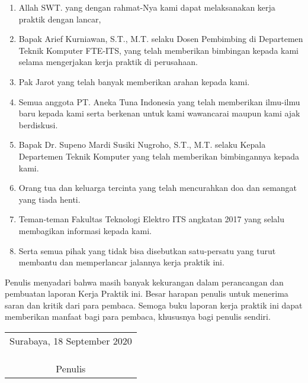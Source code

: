 \begin{enumerate}[nolistsep]

  \item Allah SWT. yang dengan rahmat-Nya kami dapat melaksanakan kerja praktik dengan lancar,
  \vspace{0.5ex}

  \item Bapak Arief Kurniawan, S.T., M.T. selaku Dosen Pembimbing di Departemen Teknik Komputer FTE-ITS, yang telah memberikan bimbingan kepada kami selama mengerjakan kerja praktik di perusahaan.
  \vspace{0.5ex}

  \item Pak Jarot yang telah banyak memberikan arahan kepada kami.
  \vspace{0.5ex}

  \item Semua anggota PT. Aneka Tuna Indonesia yang telah memberikan ilmu-ilmu baru kepada kami serta berkenan untuk kami wawancarai maupun kami ajak berdiskusi.
  \vspace{0.5ex}

  \item Bapak  Dr. Supeno Mardi Susiki Nugroho, S.T., M.T. selaku Kepala Departemen Teknik Komputer yang telah memberikan bimbingannya kepada kami.
  \vspace{0.5ex}

  \item Orang tua dan keluarga tercinta yang telah mencurahkan doa dan semangat yang tiada henti.
  \vspace{0.5ex}

  \item Teman-teman Fakultas Teknologi Elektro ITS angkatan 2017 yang selalu membagikan informasi kepada kami.
  \vspace{0.5ex}

  \item Serta semua pihak yang tidak bisa disebutkan satu-persatu yang turut membantu dan memperlancar jalannya kerja praktik ini.
  \vspace{0.5ex}

\end{enumerate}
\vspace{0.5ex}

Penulis menyadari bahwa masih banyak kekurangan dalam perancangan dan pembuatan laporan Kerja Praktik ini.
Besar harapan penulis untuk menerima saran dan kritik dari para pembaca.
Semoga buku laporan kerja praktik ini dapat memberikan manfaat bagi para pembaca, khususnya bagi penulis sendiri.
\vspace{2ex}

\begin{flushright}
  \begin{tabular}[b]{c}
    Surabaya, 18 September 2020
    \\
    \\
    \\
    \\
    Penulis
  \end{tabular}
\end{flushright}
